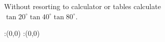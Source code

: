 
%
%
%
%
% 
% 

\question[4] Without resorting to calculator or tables calculate \\
$\tan20^\circ\tan40^\circ\tan80^\circ$.


\ifprintanswers
  \begin{marginfigure}
      :(0,0)
      :(0,0)
    \figdrawbegin{}
      \figdrawline [100,101]
    \figdrawend
    \figvisu{\figBoxA}{}{%
    }
    \centerline{\box\figBoxA}
  \end{marginfigure}
\fi 


